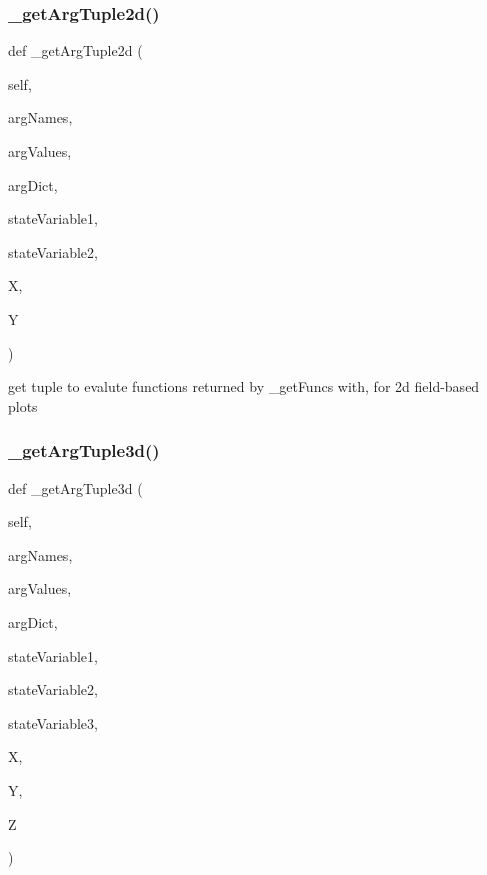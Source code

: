\subsubsection{\texorpdfstring{\+\_\+get\+Arg\+Tuple2d()}{\_getArgTuple2d()}}
{\footnotesize\ttfamily def \+\_\+get\+Arg\+Tuple2d (\begin{DoxyParamCaption}\item[{}]{self,  }\item[{}]{arg\+Names,  }\item[{}]{arg\+Values,  }\item[{}]{arg\+Dict,  }\item[{}]{state\+Variable1,  }\item[{}]{state\+Variable2,  }\item[{}]{X,  }\item[{}]{Y }\end{DoxyParamCaption})\hspace{0.3cm}{\ttfamily [private]}}



get tuple to evalute functions returned by \+\_\+get\+Funcs with, for 2d field-\/based plots 

\mbox{\label{class_mu_mo_t_1_1_mu_mo_tmodel_a4a81885dd0451b6af31285c234b61d2a}} 
\subsubsection{\texorpdfstring{\+\_\+get\+Arg\+Tuple3d()}{\_getArgTuple3d()}}
{\footnotesize\ttfamily def \+\_\+get\+Arg\+Tuple3d (\begin{DoxyParamCaption}\item[{}]{self,  }\item[{}]{arg\+Names,  }\item[{}]{arg\+Values,  }\item[{}]{arg\+Dict,  }\item[{}]{state\+Variable1,  }\item[{}]{state\+Variable2,  }\item[{}]{state\+Variable3,  }\item[{}]{X,  }\item[{}]{Y,  }\item[{}]{Z }\end{DoxyParamCaption})\hspace{0.3cm}{\ttfamily [private]}}



